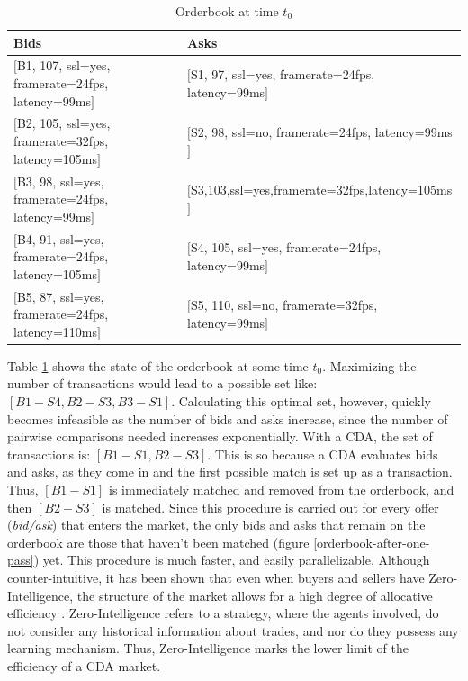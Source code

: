 \documentclass[10pt,journal,compsoc]{IEEEtran}
\begin{document}
\begin{table}
\centering
\begin{tabular}{ll}
\toprule
Bids & Asks \\
\midrule
$[$\small{B1, 107, ssl=yes, framerate=24fps, latency=99ms}$]$ & $[$\small{S1, 97, ssl=yes, framerate=24fps, latency=99ms}$]$ \\
$[$\small{B2, 105, ssl=yes, framerate=32fps, latency=105ms}$]$ & $[$\small{S2, 98, ssl=no, framerate=24fps, latency=99ms}$]$ \\
$[$\small{B3, 98, ssl=yes, framerate=24fps, latency=99ms}$]$ & $[$\small{S3,103,ssl=yes,framerate=32fps,latency=105ms}$]$ \\
$[$\small{B4, 91, ssl=yes, framerate=24fps, latency=105ms}$]$ & $[$\small{S4, 105, ssl=yes, framerate=24fps, latency=99ms}$]$ \\
$[$\small{B5, 87, ssl=yes, framerate=24fps, latency=110ms}$]$ & $[$\small{S5, 110, ssl=no, framerate=32fps, latency=99ms}$]$ \\
\bottomrule
\end{tabular}
\caption{Orderbook at time $t_{0}$ \label{orderbook}}
\end{table}
Table \ref{orderbook} shows the state of the orderbook at some time \textit{$t_{0}$}. Maximizing the number of transactions would lead to a possible set like: $[B1-S4, B2-S3, B3-S1]$. Calculating this optimal set, however, quickly becomes infeasible as the number of bids and asks increase, since the number of pairwise comparisons needed increases exponentially.  With a CDA, the set of transactions is: $[B1-S1, B2-S3]$. This is so because a CDA evaluates bids and asks, as they come in and the first possible match is set up as a transaction. Thus, $[B1-S1]$ is immediately matched and removed from the orderbook, and then $[B2-S3]$ is matched.  Since this procedure is carried out for every offer (\textit{bid/ask}) that enters the market, the only bids and asks that remain on the orderbook are those that haven't been matched (figure \ref{orderbook-after-one-pass}) yet. This procedure is much faster, and easily parallelizable. Although counter-intuitive, it has been shown that even when buyers and sellers have Zero-Intelligence, the structure of the market allows for a high degree of allocative efficiency \cite{Gode1993Allocative}. Zero-Intelligence refers to a strategy, where the agents involved, do not consider any historical information about trades, and nor do they possess any learning mechanism. Thus, Zero-Intelligence marks the lower limit of the efficiency of a CDA market.
\end{document}
